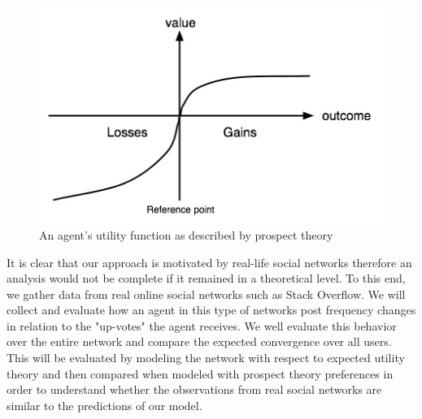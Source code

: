 \documentclass[A4paper,11pt]{article}
\begin{document}
\begin{figure}[h!]
  \centering
  \includegraphics[width=.35\linewidth]{./Valuefun.jpg}
  \caption{An agent's utility function as described by prospect theory}
  \label{fig:prospect-util}
\end{figure}

\par It is clear that our approach is motivated by real-life social networks therefore an analysis would not be complete
if it remained in a theoretical level. To this end, we gather data from real online social networks such as Stack Overflow. We will collect and evaluate how an agent in this type of networks post frequency changes in relation to the "up-votes" the agent receives. We well evaluate this behavior over the entire network and compare the expected convergence over all users.  This will be evaluated by modeling the network with respect to expected utility theory and then compared when modeled with prospect theory preferences in order to understand whether the observations from real social networks are similar to the predictions of our model.



\label{Bibliography}




\end{document}
